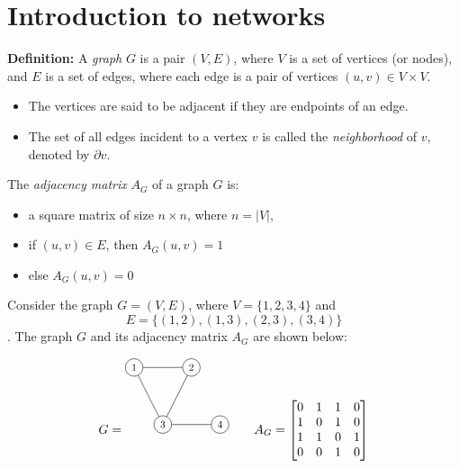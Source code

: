 \chapter{Introduction to networks}

\textbf{Definition:} A \textit{graph} $G$ is a pair $(V, E)$, where $V$ is a set of vertices (or nodes), and $E$ is a set of edges, where each edge is a pair of vertices $(u, v) \in V \times V$. 
\begin{itemize}
 \item The vertices are said to be adjacent if they are endpoints of an edge. 
 \item The set of all edges incident to a vertex $v$ is called the \textit{neighborhood} of $v$, denoted by $\partial v$.
\end{itemize}
 

The \textit{adjacency matrix} $A_G$ of a graph $G$ is:
\begin{itemize}
 \item a square matrix of size $n \times n$, where $n = |V|$,
 \item if $(u,v)\in E$, then $A_G(u,v) = 1 $ 
 \item else $A_G(u,v) = 0 $
\end{itemize}


Consider the graph $G = (V, E)$, where $V = \{1,2,3,4\}$ and \[E = \{(1,2),(1,3),(2,3),(3,4)\}\]. The graph $G$ and its adjacency matrix $A_G$ are shown below:

\[
G = \begin{tikzpicture}[scale=0.8, transform shape]
    \node[shape=circle,draw=black] (1) at (0,2) {1};
    \node[shape=circle,draw=black] (2) at (2,2) {2};
    \node[shape=circle,draw=black] (3) at (1,0) {3};
    \node[shape=circle,draw=black] (4) at (3,0) {4};
    \draw[-] (1) -- (2);
    \draw[-] (1) -- (3);
    \draw[-] (2) -- (3);
    \draw[-] (3) -- (4);
\end{tikzpicture} \qquad A_G = \begin{bmatrix}
0 & 1 & 1 & 0 \\
1 & 0 & 1 & 0 \\
1 & 1 & 0 & 1 \\
0 & 0 & 1 & 0
\end{bmatrix}
\]




